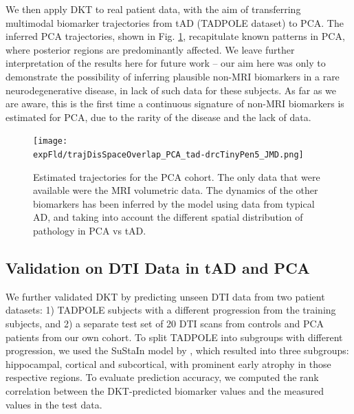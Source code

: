 \documentclass{llncs}
\begin{document}
We then apply DKT to real patient data, with the aim of transferring multimodal biomarker trajectories from tAD (TADPOLE dataset) to PCA. The inferred PCA trajectories, shown in Fig. \ref{fig:PCAtrajByModality}, recapitulate known patterns in PCA, where posterior regions are predominantly affected. We leave further interpretation of the results here for future work -- our aim here was only to demonstrate the possibility of inferring plausible non-MRI biomarkers in a rare neurodegenerative disease, in lack of such data for these subjects. As far as we are aware, this is the first time a continuous signature of non-MRI biomarkers is estimated for PCA, due to the rarity of the disease and the lack of data. 


\begin{figure}[htp]
\centering
 \texttt{[image: \\expFld/trajDisSpaceOverlap\_PCA\_tad-drcTinyPen5\_JMD.png]}
 \caption{Estimated trajectories for the PCA cohort. The only data that were available were the MRI volumetric data. The dynamics of the other biomarkers has been inferred by the model using data from typical AD, and taking into account the different spatial distribution of pathology in PCA vs tAD. }
 \label{fig:PCAtrajByModality}
\end{figure}


\subsection{Validation on DTI Data in tAD and PCA}
\label{sec:dktResVal}

We further validated DKT by predicting unseen DTI data from two patient datasets: 1) TADPOLE subjects with a different progression from the training subjects, and 2) a separate test set of 20 DTI scans from controls and PCA patients from our own cohort. To split TADPOLE into subgroups with different progression, we used the SuStaIn model by \cite{young2018uncovering}, which resulted into three subgroups: hippocampal, cortical and subcortical, with prominent early atrophy in those respective regions. To evaluate prediction accuracy, we computed the rank correlation between the DKT-predicted biomarker values and the measured values in the test data. 

\end{document}
